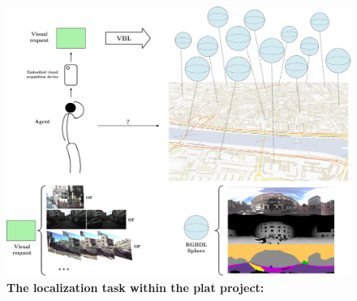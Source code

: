 \begin{figure}[t]
	\centering

	\includegraphics[width=\linewidth]{env/plat_resume}
	\caption[Localization task in \acs*{plat}]{\textbf{The localization task within the \acs*{plat} project:} \label{fig:plat_pipeline} }
\end{figure}
